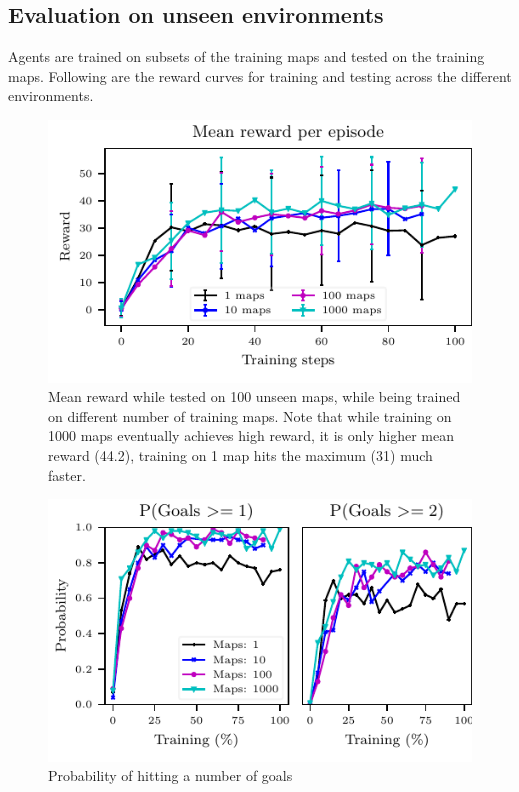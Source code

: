 \documentclass[letterpaper]{article} %
\begin{document}
\subsection{Evaluation on unseen environments}
Agents are trained on subsets of the training maps and tested on the training maps. Following are the reward curves for training and testing across the different environments. 

\begin{figure}
\includegraphics[width=\columnwidth]{images/plot_reward_3D-1000.pdf}
\caption{Mean reward while tested on 100 unseen maps, while being trained on different number of training maps. Note that while training on 1000 maps eventually achieves high reward, it is only higher mean reward (44.2), training on 1 map hits the maximum (31) much faster.}
\label{fig:plot_reward_on_testing}
\end{figure}

\begin{figure}
\includegraphics[width=\columnwidth]{images/plot_probability_3D-1000.pdf}
\caption{Probability of hitting a number of goals}
\label{fig:plot_reward_on_testing}
\end{figure}
\end{document}
